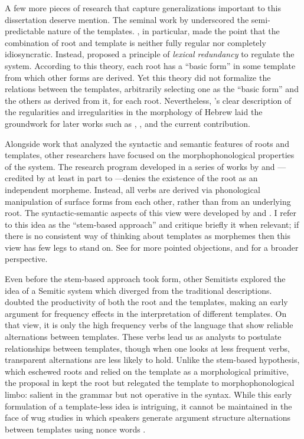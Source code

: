 A few more pieces of research that capture generalizations important to this dissertation deserve mention. The seminal work by \cite{berman78} underscored the semi-predictable nature of the templates. \citet[Ch.~3]{berman78}, in particular, made the point that the combination of root and template is neither fully regular nor completely idiosyncratic. Instead, \citeauthor{berman78} proposed a principle of \emph{lexical redundancy} to regulate the system. According to this theory, each root has a ``basic form'' in some template from which other forms are derived. Yet this theory did not formalize the relations between the templates, arbitrarily selecting one as the ``basic form'' and the others as derived from it, for each root. Nevertheless, \citeauthor{berman78}'s clear description of the regularities and irregularities in the morphology of Hebrew laid the groundwork for later works such as \cite{doron03}, \cite{arad05}, \cite{borer13oup} and the current contribution.

Alongside work that analyzed the syntactic and semantic features of roots and templates, other researchers have focused on the morphophonological properties of the system. The research program developed in a series of works by \cite{batel89,batel94} and \cite{ussishkin00phd,ussishkin05}---credited by \cite{ussishkin00phd} at least in part to \cite{horvath81}---denies the existence of the root as an independent morpheme. Instead, all verbs are derived via phonological manipulation of surface forms from each other, rather than from an underlying root. The syntactic-semantic aspects of this view were developed by \cite{reinhartsiloni05} and \cite{laks11,laks13morpho,laks14,laks18}. I refer to this idea as the ``stem-based approach'' and critique briefly it when relevant; if there is no consistent way of thinking about templates as morphemes then this view has few legs to stand on. See \cite{kastner17gjgl,kastner18nllt} for more pointed objections, and \cite{kastnertucker19cup} for a broader perspective.

Even before the stem-based approach took form, other Semitists explored the idea of a Semitic system which diverged from the traditional descriptions. \cite{schwarzwald73} doubted the productivity of both the root and the templates, making an early argument for frequency effects in the interpretation of different templates. On that view, it is only the high frequency verbs of the language that show reliable alternations between templates. These verbs lead us as analysts to postulate relationships between templates, though when one looks at less frequent verbs, transparent alternations are less likely to hold. Unlike the stem-based hypothesis, which eschewed roots and relied on the template as a morphological primitive, the proposal in \cite{schwarzwald73} kept the root but relegated the template to morphophonological limbo: salient in the grammar but not operative in the syntax. While this early formulation of a template-less idea is intriguing, it cannot be maintained in the face of wug studies in which speakers generate argument structure alternations between templates using nonce words \citep{berman93jcl,moorecantwell13}.

